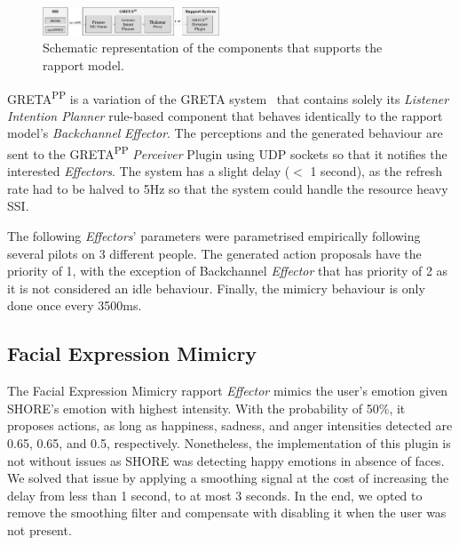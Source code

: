 \begin{figure}[H]
	\centering
	\includegraphics[width=0.47\textwidth]{figures/SupportingTechnologiesOverview.png}
	\caption{Schematic representation of the components that supports the rapport model.}
	\label{fig:SupportingTechnologiesOverview}
\end{figure}

GRETA\textsuperscript{PP} is a variation of the GRETA system~\cite{Niewiadomski2009} that contains solely its \textit{Listener Intention Planner} rule-based component that behaves identically to the rapport model's \textit{Backchannel} \textit{Effector}. The perceptions and the generated behaviour are sent to the GRETA\textsuperscript{PP} \textit{Perceiver} Plugin using \ac{UDP} sockets so that it notifies the interested \textit{Effectors}. The system has a slight delay ($<$ 1 second), as the refresh rate had to be halved to 5Hz so that the system could handle the resource heavy \ac{SSI}.

The following \textit{Effectors}' parameters were parametrised empirically following several pilots on 3 different people. The generated action proposals have the priority of 1, with the exception of Backchannel \textit{Effector} that has priority of 2 as it is not considered an idle behaviour. Finally, the mimicry behaviour is only done once every 3500ms.


\subsection{Facial Expression Mimicry}
\label{sub:sec:facialExpressionMimicryImplementation}

The Facial Expression Mimicry rapport \textit{Effector} mimics the user's emotion given SHORE's emotion with highest intensity. With the probability of 50\%, it proposes actions, as long as happiness, sadness, and anger intensities detected are 0.65, 0.65, and 0.5, respectively. Nonetheless, the implementation of this plugin is not without issues as SHORE was detecting happy emotions in absence of faces. We solved that issue by applying a smoothing signal at the cost of increasing the delay from less than 1 second, to at most 3 seconds. In the end, we opted to remove the smoothing filter and compensate with disabling it when the user was not present.

